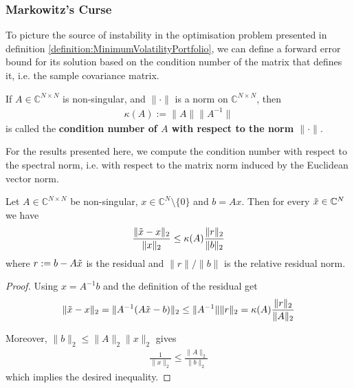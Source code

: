     \subsubsection{Markowitz's Curse}\label{section:MarkowitzsCurse}
        
		
		To picture the source of instability in the optimisation problem presented in definition \ref{definition:MinimumVolatilityPortfolio}, we can define a forward error bound for its solution based on the condition number of the matrix that defines it, i.e. the sample covariance matrix.
		
		\begin{definition}
		    If $A \in \mathbb{C}^{N \times N}$ is non-singular, and $\| \cdot \|$ is a norm on $\mathbb{C}^{N \times N}$, then
		    \begin{align*}
		        \kappa(A) := \| A \| \| A^{-1} \|
		    \end{align*}
		    is called the \textbf{condition number of $A$ with respect to the norm $\| \cdot \|$}.
		\end{definition}
		
		For the results presented here, we compute the condition number with respect to the spectral norm, i.e. with respect to the matrix norm induced by the Euclidean vector norm.
		
		\begin{theorem}
			Let $A \in \mathbb{C}^{N \times N}$ be non-singular, $x \in \mathbb{C}^N \setminus \{ 0 \}$ and $b = Ax$. Then for every $\Tilde{x} \in \mathbb{C}^N$ we have
			\begin{align*}
				\frac{\| \Tilde{x} - x \|_2}{\| x \|_2} \leq \kappa(A) \frac{\| r \|_2}{\| b \|_2}
			\end{align*}
			where $r := b - A \Tilde{x}$ is the residual and $\| r \| / \| b \|$ is the relative residual norm.
		\end{theorem}
		
		\begin{proof}
			Using $x = A^{-1} b$ and the definition of the residual get
			\begin{align*}
				\| \Tilde{x} - x \|_2 = \| A^{-1} (A \Tilde{x} - b)\|_2 \leq \| A^{-1} \| \| r \|_2 = \kappa(A) \frac{\| r \|_2}{\| A \|_2}
			\end{align*}
			
			Moreover, $\| b \|_2 \leq \| A \|_2 \| x \|_2$ gives
			\begin{align*}
				\frac{1}{\| x \|_2} \leq \frac{\| A \|_2}{\| b \|_2}
			\end{align*}
			which implies the desired inequality.
		\end{proof}
		
